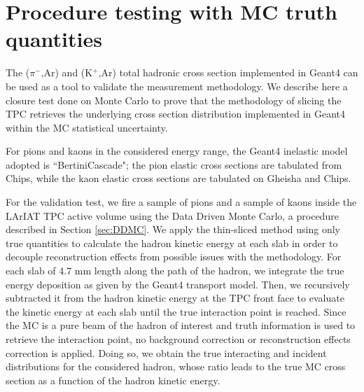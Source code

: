 




\section{Procedure testing with MC truth quantities}\label{ch:procedureTesting}
The ($\pi^{-}$,Ar) and (K$^{+}$,Ar) total hadronic cross section implemented in Geant4 can be used as a tool to validate the measurement methodology.  We describe here a closure test done on Monte Carlo to prove that the methodology of slicing the TPC retrieves the underlying cross section distribution implemented in Geant4 within the MC statistical uncertainty. 

For pions and kaons in the considered energy range, the Geant4 inelastic model adopted is ``BertiniCascade"; the pion elastic cross sections are tabulated from Chips, while the kaon elastic cross sections are tabulated on Gheisha and Chips.

For the validation test, we fire a sample of pions and a sample of kaons inside the LArIAT TPC active volume using the Data Driven Monte Carlo, a procedure described in Section \ref{sec:DDMC}. We apply the thin-sliced method using only true quantities to calculate the hadron kinetic energy at each slab in order to decouple reconstruction effects from possible issues with the methodology.  For each slab of 4.7 mm length along the path of the hadron, we integrate the true energy deposition as given by the Geant4 transport model. Then, we recursively subtracted it from the hadron kinetic energy at the TPC front face to evaluate the kinetic energy at each slab until the true interaction point is reached. Since the MC is a pure beam of the hadron of interest and truth information is used to retrieve the interaction point, no background correction or reconstruction effects correction is applied. Doing so, we obtain the true interacting and incident distributions for the considered hadron, whose ratio leads to  the true MC cross section as a function of the hadron kinetic energy. 

